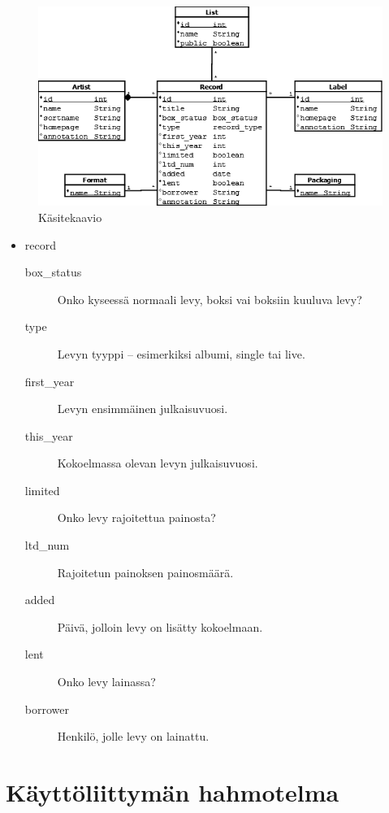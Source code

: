 \documentclass[a4paper,12pt]{report}
\begin{document}
\begin{figure}[H]
\begin{center}
\includegraphics[width=\textwidth]{kasitekaavio}
\end{center}
\caption{Käsitekaavio}
\end{figure}

\begin{itemize}
\item record
\begin{description}
\item[box\_status] Onko kyseessä normaali levy, boksi vai boksiin kuuluva levy?
\item[type] Levyn tyyppi -- esimerkiksi albumi, single tai live.
\item[first\_year] Levyn ensimmäinen julkaisuvuosi.
\item[this\_year] Kokoelmassa olevan levyn julkaisuvuosi.
\item[limited] Onko levy rajoitettua painosta?
\item[ltd\_num] Rajoitetun painoksen painosmäärä.
\item[added] Päivä, jolloin levy on lisätty kokoelmaan.
\item[lent] Onko levy lainassa?
\item[borrower] Henkilö, jolle levy on lainattu.
\end{description}
\end{itemize}

\section{Käyttöliittymän hahmotelma}
\end{document}
